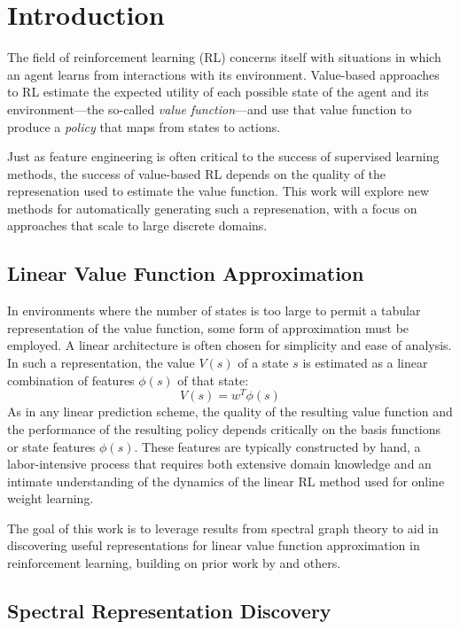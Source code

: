 \section{Introduction}

The field of reinforcement learning (RL) concerns itself with situations in
which an agent learns from interactions with its environment. Value-based
approaches to RL estimate the expected utility of each possible state of the
agent and its environment---the so-called \emph{value function}---and use that
value function to produce a \emph{policy} that maps from states to actions.

Just as feature engineering is often critical to the success of supervised
learning methods, the success of value-based RL depends on the quality of the
represenation used to estimate the value function. This work will explore new
methods for automatically generating such a represenation, with a focus on
approaches that scale to large discrete domains.

\subsection{Linear Value Function Approximation}

In environments where the number of states is too large to permit a tabular
representation of the value function, some form of approximation must be
employed. A linear architecture is often chosen for simplicity and ease of
analysis. In such a representation, the value $V(s)$ of a state $s$ is
estimated as a linear combination of features $\phi(s)$ of that state:
%
\begin{equation}
V(s) = w^{T}\phi(s)
\end{equation}
%
As in any linear prediction scheme, the quality of the resulting value function
and the performance of the resulting policy depends critically on the basis
functions or state features $\phi(s)$. These features are typically constructed
by hand, a labor-intensive process that requires both extensive domain
knowledge and an intimate understanding of the dynamics of the linear RL method
used for online weight learning.

The goal of this work is to leverage results from spectral graph theory to aid
in discovering useful representations for linear value function approximation
in reinforcement learning, building on prior work by \citet{Mahadevan2006Value}
and others.

\subsection{Spectral Representation Discovery}

